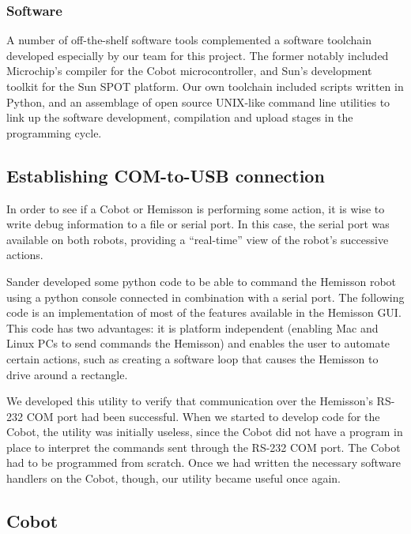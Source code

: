 \documentclass[a4paper,10pt]{article} %
\begin{document}
\subsubsection{Software}

A number of off-the-shelf software tools complemented a software toolchain
developed especially by our team for this project. The former notably included
Microchip's compiler for the Cobot microcontroller, and Sun's development toolkit
for the Sun SPOT platform. Our own toolchain included scripts written in Python,
and an assemblage of open source UNIX-like command line utilities to link up the
software development, compilation and upload stages in the programming cycle.


\subsection{Establishing COM-to-USB connection} %
\label{sub:Establishing COM-to-USB connection}

In order to see if a Cobot or Hemisson is performing some action, it is wise to
write debug information to a file or serial port. In this case, the serial port
was available on both robots, providing a ``real-time'' view of the
robot's successive actions.

Sander developed some python code to be able to command the Hemisson robot using
a python console connected in combination with a serial port. The following code
is an implementation of most of the features available in the Hemisson GUI.
This code has two advantages: it is platform independent (enabling Mac and Linux
PCs to send commands the Hemisson) and enables the user to automate certain
actions, such as creating a software loop that causes the Hemisson to drive
around a rectangle.



\noindent We developed this utility to verify that communication over the
Hemisson's RS-232 COM port had been successful. When we started to develop code
for the Cobot, the utility was initially useless, since the Cobot did not have a
program in place to interpret the commands sent through the RS-232 COM port. The
Cobot had to be programmed from scratch. Once we had written the necessary
software handlers on the Cobot, though, our utility became useful once again.


\subsection{Cobot} %
\end{document}
